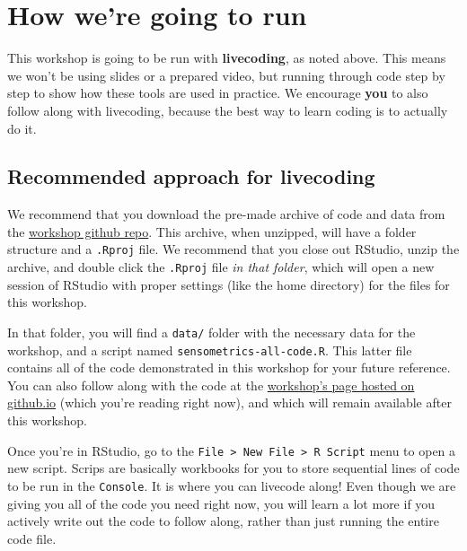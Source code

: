 \documentclass[
]{book}
\begin{document}
\hypertarget{how-were-going-to-run}{%
\section*{How we're going to run}\label{how-were-going-to-run}}

This workshop is going to be run with \textbf{livecoding}, as noted above. This means we won't be using slides or a prepared video, but running through code step by step to show how these tools are used in practice. We encourage \textbf{you} to also follow along with livecoding, because the best way to learn coding is to actually do it.

\hypertarget{recommended-approach-for-livecoding}{%
\subsection*{Recommended approach for livecoding}\label{recommended-approach-for-livecoding}}

We recommend that you download the pre-made archive of code and data from the \href{https://github.com/lhami/sensometrics-tutorial-2024}{workshop github repo}. This archive, when unzipped, will have a folder structure and a \texttt{.Rproj} file. We recommend that you close out RStudio, unzip the archive, and double click the \texttt{.Rproj} file \emph{in that folder}, which will open a new session of RStudio with proper settings (like the home directory) for the files for this workshop.

In that folder, you will find a \texttt{data/} folder with the necessary data for the workshop, and a script named \texttt{sensometrics-all-code.R}. This latter file contains all of the code demonstrated in this workshop for your future reference. You can also follow along with the code at the \href{https://lhami.github.io/sensometrics-tutorial-2024}{workshop's page hosted on github.io} (which you're reading right now), and which will remain available after this workshop.

Once you're in RStudio, go to the \texttt{File\ \textgreater{}\ New\ File\ \textgreater{}\ R\ Script} menu to open a new script. Scrips are basically workbooks for you to store sequential lines of code to be run in the \texttt{Console}. It is where you can livecode along! Even though we are giving you all of the code you need right now, you will learn a lot more if you actively write out the code to follow along, rather than just running the entire code file.
\end{document}
